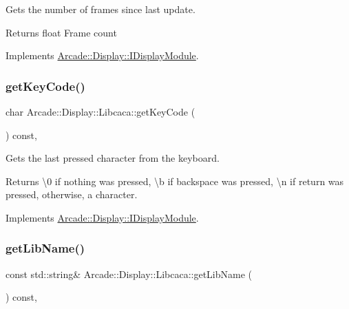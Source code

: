 Gets the number of frames since last update. 

\begin{DoxyReturn}{Returns}
float Frame count 
\end{DoxyReturn}


Implements \mbox{\hyperlink{classArcade_1_1Display_1_1IDisplayModule_aab078d82e6fdd32682553947c20226ac}{Arcade\+::\+Display\+::\+I\+Display\+Module}}.

\mbox{\label{classArcade_1_1Display_1_1Libcaca_a741fdec5c2e77cc7959e5f3444f8c8ac}} 
\subsubsection{\texorpdfstring{getKeyCode()}{getKeyCode()}}
{\footnotesize\ttfamily char Arcade\+::\+Display\+::\+Libcaca\+::get\+Key\+Code (\begin{DoxyParamCaption}{ }\end{DoxyParamCaption}) const\hspace{0.3cm}{\ttfamily [final]}, {\ttfamily [virtual]}}



Gets the last pressed character from the keyboard. 

\begin{DoxyReturn}{Returns}
\textbackslash{}0 if nothing was pressed, \textbackslash{}b if backspace was pressed, \textbackslash{}n if return was pressed, otherwise, a character. 
\end{DoxyReturn}


Implements \mbox{\hyperlink{classArcade_1_1Display_1_1IDisplayModule_a403f8a0f065dad707a881ef3cee79805}{Arcade\+::\+Display\+::\+I\+Display\+Module}}.

\mbox{\label{classArcade_1_1Display_1_1Libcaca_a26e6dd02a853963fdcb812bddb3dee1e}} 
\subsubsection{\texorpdfstring{getLibName()}{getLibName()}}
{\footnotesize\ttfamily const std\+::string\& Arcade\+::\+Display\+::\+Libcaca\+::get\+Lib\+Name (\begin{DoxyParamCaption}{ }\end{DoxyParamCaption}) const\hspace{0.3cm}{\ttfamily [final]}, {\ttfamily [virtual]}}



